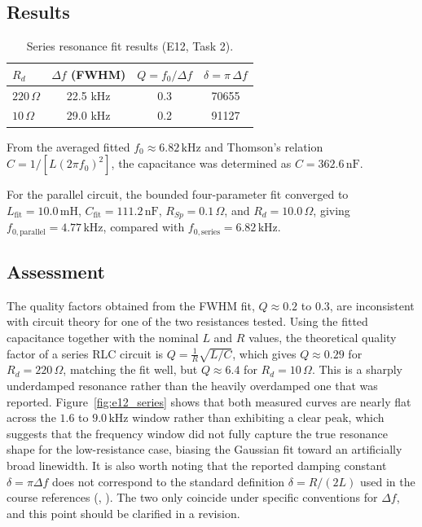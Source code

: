\documentclass[a4paper, 10pt]{article}
\newcommand{\kHz}{\si{\kilo\hertz}}
\newcommand{\mH}{\si{\milli\henry}}
\newcommand{\nF}{\si{\nano\farad}}
\begin{document}
\subsection{Results}

\begin{table}[H]
\centering
\caption{Series resonance fit results (E12, Task 2).}
\begin{tabular}{lccc}
\toprule
$R_d$ & $\Delta f$ (FWHM) & $Q = f_0/\Delta f$ & $\delta = \pi\,\Delta f$ \\
\midrule
$220\,\Omega$ & 22.5 kHz & 0.3 & 70655 \\
$10\,\Omega$  & 29.0 kHz & 0.2 & 91127 \\
\bottomrule
\end{tabular}
\end{table}

From the averaged fitted $f_0 \approx 6.82\,\kHz$ and Thomson's
relation $C = 1/[L(2\pi f_0)^2]$, the capacitance was determined as
$C = 362.6\,\nF$.

For the parallel circuit, the bounded four-parameter fit converged to
$L_{\text{fit}} = 10.0\,\mH$, $C_{\text{fit}} = 111.2\,\nF$,
$R_{Sp} = 0.1\,\Omega$, and $R_d = 10.0\,\Omega$, giving
$f_{0,\text{parallel}} = 4.77\,\kHz$, compared with
$f_{0,\text{series}} = 6.82\,\kHz$.

\subsection{Assessment}

The quality factors obtained from the FWHM fit, $Q \approx 0.2$ to $0.3$,
are inconsistent with circuit theory for one of the two resistances tested.
Using the fitted capacitance together with the nominal $L$ and $R$ values,
the theoretical quality factor of a series RLC circuit is
$Q = \frac{1}{R}\sqrt{L/C}$, which gives $Q \approx 0.29$ for
$R_d = 220\,\Omega$, matching the fit well, but $Q \approx 6.4$ for
$R_d = 10\,\Omega$. This is a sharply underdamped resonance rather than the
heavily overdamped one that was reported. Figure~\ref{fig:e12_series} shows
that both measured curves are nearly flat across the $1.6$ to
$9.0\,\kHz$ window rather than exhibiting a clear peak, which suggests
that the frequency window did not fully capture the true resonance shape
for the low-resistance case, biasing the Gaussian fit toward an
artificially broad linewidth. It is also worth noting that the reported
damping constant $\delta = \pi \Delta f$ does not correspond to the
standard definition $\delta = R/(2L)$ used in the course references
(\cite{tipler}, \cite{demtroeder}). The two only coincide under specific conventions for
$\Delta f$, and this point should be clarified in a revision.
\end{document}
